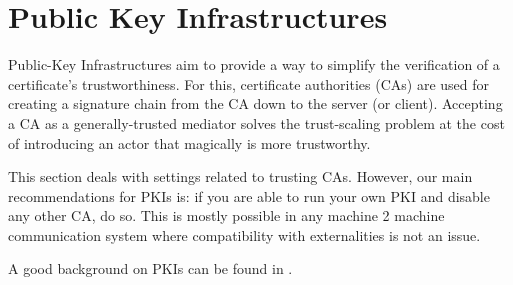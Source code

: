 \section{Public Key Infrastructures}
\label{section:PKIs}

Public-Key Infrastructures aim to provide a way to simplify the verification of
a certificate's trustworthiness.  For this, certificate authorities (CAs) are
used for creating a signature chain from the CA down to the server (or client).
Accepting a CA as a generally-trusted mediator solves the trust-scaling problem
at the cost of introducing an actor that magically is more trustworthy.

This section deals with settings related to trusting CAs.  However, our main
recommendations for PKIs is: if you are able to run your own PKI and disable
any other CA, do so.  This is mostly possible in any machine 2 machine
communication system where compatibility with externalities is not an issue.

A good background on PKIs can be found in .



